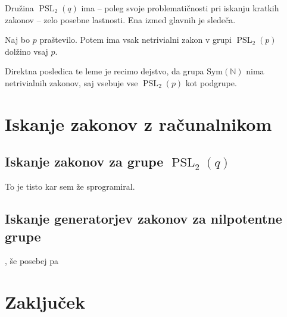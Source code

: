 \documentclass[mat1, tisk]{fmfdelo}
\numberwithin{equation}{section}  %
\begin{document}
    Družina $\operatorname{PSL}_2(q)$ ima -- poleg svoje problematičnosti pri iskanju kratkih zakonov -- zelo posebne lastnosti. Ena izmed glavnih je sledeča. 
    \begin{lema}
    Naj bo $p$ praštevilo. Potem ima vsak netrivialni zakon v grupi $\operatorname{PSL}_2(p)$ dolžino vsaj $p$.
    \end{lema}
    \noindent
    Direktna posledica te leme je recimo dejstvo, da grupa $\text{Sym}(\mathbb{N})$ nima
    netrivialnih zakonov, saj vsebuje vse $\operatorname{PSL}_2(p)$ kot podgrupe.
    







\cite{Kozma_Thom_2016}

\section{Iskanje zakonov z računalnikom}

\subsection{Iskanje zakonov za grupe $\operatorname{PSL}_2(q)$} %

To je tisto kar sem že sprogramiral.

\subsection{Iskanje generatorjev zakonov za nilpotentne grupe}

\cite{Cocke_2020}, še posebej pa \cite{Chilebus_Cocke_Ho_2024}

\section{Zaključek}
\end{document}
